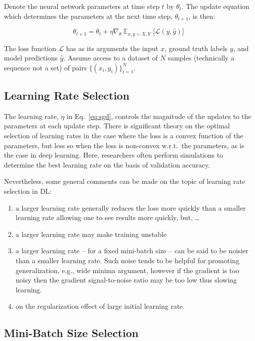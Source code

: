 \documentclass[11pt]{article} %
\begin{document}
Denote the neural network parameters at time step $t$ by $\theta_t$. The update
equation which determines the parameters at the next time step, $\theta_{t + 
1}$, is then:

\begin{equation} \label{eq:sgd}
\theta_{t + 1} = \theta_t + \eta \nabla_{\theta} \mathop{\mathbb{E}}_{x,y \sim 
X, Y} \big[ \mathcal{L}(y, \hat{y}) \big]
\end{equation}

The loss function $\mathcal{L}$ has as its arguments the input $x$, ground
truth labels $y$, and model predictions $\hat{y}$. Assume access to a dataset 
of $N$ samples (technically a sequence not a set) of pairs 
$\{ (x_i, y_i)\}_{i=1}^{N} $.

\subsection{Learning Rate Selection}

The learning rate, $\eta$ in Eq.~\eqref{eq:sgd}, controls the magnitude of the 
updates to the parameters at each update step. There is significant theory on
the optimal selection of learning rates in the case where the loss is a convex
function of the parameters, but less so when the loss is non-convex w.r.t.~the
parameters, as is the case in deep learning. Here, researchers often perform
simulations to determine the best learning rate on the basis of validation 
accuracy.

Nevertheless, some general comments can be made on the topic of learning rate 
selection in DL: 

\begin{enumerate}
\item a larger learning rate generally reduces the loss more quickly than a
smaller learning rate allowing one to see results more quickly, but, \dots
\item a larger learning rate may make training unstable
\item a larger learning rate -- for a fixed mini-batch size -- can be said to
be noisier than a smaller learning rate. Such noise tends to be helpful for 
promoting generalization, e.g., wide minima argument, however if the gradient 
is too noisy then the gradient signal-to-noise ratio may be too low thus 
slowing learning.
\item on the regularization effect of large initial learning rate.
\end{enumerate}

\subsection{Mini-Batch Size Selection}
\end{document}

